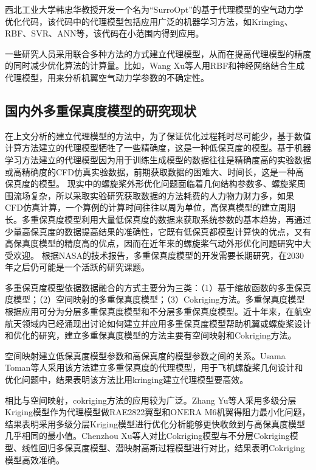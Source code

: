 西北工业大学韩忠华教授开发一个名为“SurroOpt”的基于代理模型的空气动力学优化代码\cite{Han2016}，该代码中的代理模型包括应用广泛的机器学习方法，如Kringing、RBF、SVR、ANN等，该代码在小范围内得到应用\cite{Han2020,WangKai2023}。

一些研究人员采用联合多种方法的方式建立代理模型，从而在提高代理模型的精度的同时减少优化算法的计算量。比如，Wang Xu等人用RBF和神经网络结合生成代理模型，用来分析机翼空气动力学参数的不确定性\cite{Wang2019}。


\vspace{0.8em}
\subsection{国内外多重保真度模型的研究现状}\label{Sec: multi-fidelity}
\vspace{0.8em}

在上文分析的建立代理模型的方法中，为了保证优化过程耗时尽可能少，基于数值计算方法建立的代理模型牺牲了一些精确度，这是一种低保真度的模型。基于机器学习方法建立的代理模型因为用于训练生成模型的数据往往是精确度高的实验数据或高精确度的CFD仿真实验数据，前期获取数据的困难大、时间长，这是一种高保真度的模型。
现实中的螺旋桨外形优化问题面临着几何结构参数多、螺旋桨周围流场复杂，所以采取实验研究获取数据的方法耗费的人力物力财力多，如果CFD仿真计算，一个算例的计算时间往往以周为单位，高保真模型的建立周期长。多重保真度模型利用大量低保真度的数据来获取系统参数的基本趋势，再通过少量高保真度的数据提高结果的准确性，它既有低保真都模型计算快的优点，又有高保真度模型的精度高的优点，因而在近年来的螺旋桨气动外形优化问题研究中大受欢迎。
根据NASA的技术报告，多重保真度模型的开发需要长期研究，在2030年之后仍可能是一个活跃的研究课题\cite{Slotnick2014,Slotnick2014Enab}。

多重保真度模型依据数据融合的方式主要分为三类：（1）基于缩放函数的多重保真度模型；（2）空间映射的多重保真度模型；（3）Cokriging方法\cite{Zhou2023}。多重保真度模型根据应用可分为分层多重保真度模型和不分层多重保真度模型\cite{Feldstein2020}。近十年来，在航空航天领域内已经涌现出讨论如何建立并应用多重保真度模型帮助机翼或螺旋桨设计和优化的研究，建立多重保真度模型的方法主要有空间映射和Cokriging方法。

空间映射建立低保真度模型参数和高保真度的模型参数之间的关系\cite{Bakr2001}。Usama Toman等人采用该方法建立多重保真度的代理模型，用于飞机螺旋桨几何设计和优化问题中，结果表明该方法比用kringing建立代理模型要高效\cite{Toman2019}。

相比与空间映射，cokriging方法的应用较为广泛。Zhang Yu等人采用多级分层Kriging模型作为代理模型做RAE2822翼型和ONERA M6机翼得阻力最小化问题，结果表明采用多级分层Kriging模型进行优化分析能够更快收敛到与高保真度模型几乎相同的最小值\cite{Zhang2024}。Chenzhou Xu等人对比Cokriging模型与不分层Cokriging模型、线性回归多保真度模型、潜映射高斯过程模型进行对比，结果表明Cokriging模型高效准确\cite{ChenzhouXu2024}。


